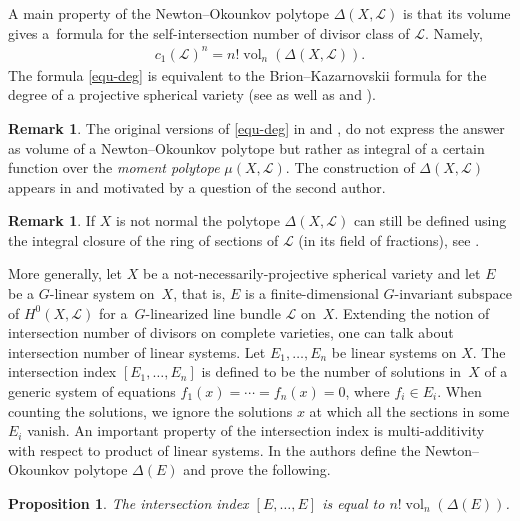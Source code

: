 \documentclass[pdftex]{sigma}
\def \vol{\operatorname{vol}}
\numberwithin{equation}{section}
\newtheorem{Prop}[Th]{Proposition}
\theoremstyle{definition}
\newtheorem{Rem}[Th]{Remark}
\begin{document}
A main property of the Newton--Okounkov polytope $\Delta(X, {\mathcal L})$ is that its volume gives a~formula for the self-intersection number of divisor class of ${\mathcal L}$. Namely,
\begin{gather} \label{equ-deg}
c_1({\mathcal L})^n = n! \vol_n(\Delta(X, {\mathcal L})).
\end{gather}
The formula \eqref{equ-deg} is equivalent to the Brion--Kazarnovskii formula for the degree of a projective spherical variety (see \cite[Theorem~2.5]{Kaveh-note} as well as \cite{Kazarnovskii} and \cite{Brion}).

\begin{Rem} \label{rem-Brion-Kaz-original-statement}
The original versions of \eqref{equ-deg} in \cite{Kazarnovskii} and \cite{Brion}, do not express the answer as volume of a Newton--Okounkov polytope but rather as integral of a certain function over the {\it moment polytope} $\mu(X, {\mathcal L})$. The construction of $\Delta(X, {\mathcal L})$ appears in \cite{Okounkov-sph} and \cite{AB} motivated by a question of the second author.
\end{Rem}

\begin{Rem} \label{rem-not-normal}
If $X$ is not normal the polytope $\Delta(X, {\mathcal L})$ can still be defined using the integral closure of the ring of sections of ${\mathcal L}$ (in its field of fractions), see \cite[Section~6.2]{KKh-reductive}.
\end{Rem}

More generally, let $X$ be a not-necessarily-projective spherical variety and let $E$ be a $G$-linear system on~$X$, that is, $E$ is a finite-dimensional $G$-invariant subspace of $H^0(X, {\mathcal L})$ for a~$G$-linearized line bundle ${\mathcal L}$ on~$X$. Extending the notion of intersection number of divisors on complete varieties, one can talk about intersection number of linear systems. Let $E_1, \ldots, E_n$ be linear systems on $X$. The intersection index $[E_1, \ldots , E_n]$ is defined to be the number of solutions in~$X$ of a generic system of equations $f_1(x) = \cdots = f_n(x) = 0$, where $f_i \in E_i$. When counting the solutions, we ignore the solutions $x$ at which all the sections in some $E_i$ vanish. An important property of the intersection index is multi-additivity with respect to product of linear systems. In \cite[Section~6]{KKh-reductive} the authors define the Newton--Okounkov polytope $\Delta(E)$ and prove the following.

\begin{Prop} \label{prop-Brion-Kaz-linear-system}
The intersection index $[E, \ldots, E]$ is equal to $n! \vol_n(\Delta(E))$.
\end{Prop}
\end{document}
